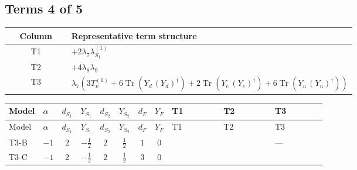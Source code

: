 \documentclass[8pt]{article}
\begin{document}
\begin{landscape}
\subsection*{Terms 4 of 5}
\begin{center}
\begin{tabular}{@{}c >{\raggedright\arraybackslash}p{0.82\linewidth}@{}}
\toprule
Column & Representative term structure \\
\midrule
T1 & \(\displaystyle +2 {\lambda_7} {\lambda_{S_1}^{(1)}}\) \\
\midrule
T2 & \(\displaystyle +4 {\lambda_8} {\lambda_9}\) \\
\midrule
T3 & \(\displaystyle {\lambda_7} (3 T_{\nu}^{(1)}+6 \operatorname{Tr}\!\left({Y_d}\,\left({Y_d}\right)^{\dagger}\right)+2 \operatorname{Tr}\!\left({Y_e}\,\left({Y_e}\right)^{\dagger}\right)+6 \operatorname{Tr}\!\left({Y_u}\,\left({Y_u}\right)^{\dagger}\right))\) \\
\midrule
\bottomrule
\end{tabular}
\end{center}
\smallskip
\tiny
\begin{longtable}{@{}llcccccc >{\raggedright\arraybackslash}p{0.21\linewidth} >{\raggedright\arraybackslash}p{0.21\linewidth} >{\raggedright\arraybackslash}p{0.21\linewidth}@{}}
\toprule
Model & $\alpha$ & $d_{S_1}$ & $Y_{S_1}$ & $d_{S_2}$ & $Y_{S_2}$ & $d_F$ & $Y_F$ & T1 & T2 & T3 \\
\midrule
\endfirsthead
\toprule
Model & $\alpha$ & $d_{S_1}$ & $Y_{S_1}$ & $d_{S_2}$ & $Y_{S_2}$ & $d_F$ & $Y_F$ & T1 & T2 & T3 \\
\midrule
\endhead
T3-B & $-1$ & $2$ & $-\frac{1}{2}$ & $2$ & $\frac{1}{2}$ & $1$ & $0$ & \scriptsize\adjustbox{max width=\linewidth}{$\begin{gathered} +2 {\lambda_7} {\lambda_{S_1}^{(1)}}\end{gathered}$} & \scriptsize\adjustbox{max width=\linewidth}{$\begin{gathered} +4 {\lambda_8} {\lambda_9}\end{gathered}$} & --- \\
\midrule
T3-C & $-1$ & $2$ & $-\frac{1}{2}$ & $2$ & $\frac{1}{2}$ & $3$ & $0$ & \scriptsize\adjustbox{max width=\linewidth}{$\begin{gathered} +2 {\lambda_7} {\lambda_{S_1}^{(1)}}\end{gathered}$} & \scriptsize\adjustbox{max width=\linewidth}{$\begin{gathered} +4 {\lambda_8} {\lambda_9}\end{gathered}$} & \scriptsize\adjustbox{max width=\linewidth}{$\begin{gathered} {\lambda_7} (3 T_{\nu}^{(1)}+6 \operatorname{Tr}\!\left({Y_d}\,\left({Y_d}\right)^{\dagger}\right)+2 \operatorname{Tr}\!\left({Y_e}\,\left({Y_e}\right)^{\dagger}\right)+6 \operatorname{Tr}\!\left({Y_u}\,\left({Y_u}\right)^{\dagger}\right))\end{gathered}$} \\

\end{longtable}
\end{landscape}
\end{document}
